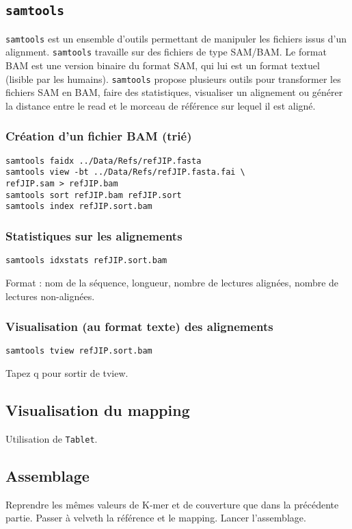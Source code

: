 \documentclass[a4paper,12pt]{article}
\begin{document}
\subsection{{\tt samtools}}

{\tt samtools} est un ensemble d'outils permettant de manipuler les fichiers issus d'un alignment. {\tt samtools} travaille sur des fichiers de type SAM/BAM. Le format BAM est une version binaire du format SAM, qui lui est un format textuel (lisible par les humains). {\tt samtools} propose plusieurs outils pour transformer les fichiers SAM en BAM, faire des statistiques, visualiser un alignement ou générer la distance entre le read et le morceau de référence sur lequel il est aligné.

\subsubsection*{Création d'un fichier BAM (trié)}
\begin{lstlisting}
samtools faidx ../Data/Refs/refJIP.fasta
samtools view -bt ../Data/Refs/refJIP.fasta.fai \
refJIP.sam > refJIP.bam
samtools sort refJIP.bam refJIP.sort
samtools index refJIP.sort.bam
\end{lstlisting}

\subsubsection*{Statistiques sur les alignements}
\begin{lstlisting}
samtools idxstats refJIP.sort.bam
\end{lstlisting}
Format : nom de la séquence, longueur, nombre de lectures alignées, nombre de lectures non-alignées.

\subsubsection*{Visualisation (au format texte) des alignements}
\begin{lstlisting}
samtools tview refJIP.sort.bam
\end{lstlisting}
Tapez q pour sortir de tview.



\subsection{Visualisation du mapping}
Utilisation de \verb=Tablet=.

\subsection{Assemblage}
Reprendre les mêmes valeurs de K-mer et de couverture que dans la précédente partie. Passer à velveth la référence et le mapping. Lancer l'assemblage.
\end{document}
